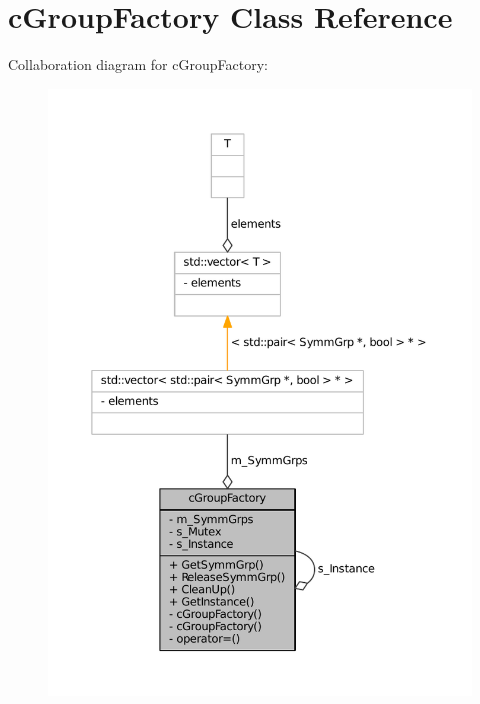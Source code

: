 \hypertarget{classcGroupFactory}{
\section{c\-Group\-Factory \-Class \-Reference}
\label{classcGroupFactory}
}


\-Collaboration diagram for c\-Group\-Factory\-:\nopagebreak
\begin{figure}[H]
\begin{center}
\leavevmode
\includegraphics[width=350pt]{classcGroupFactory__coll__graph}
\end{center}
\end{figure}
